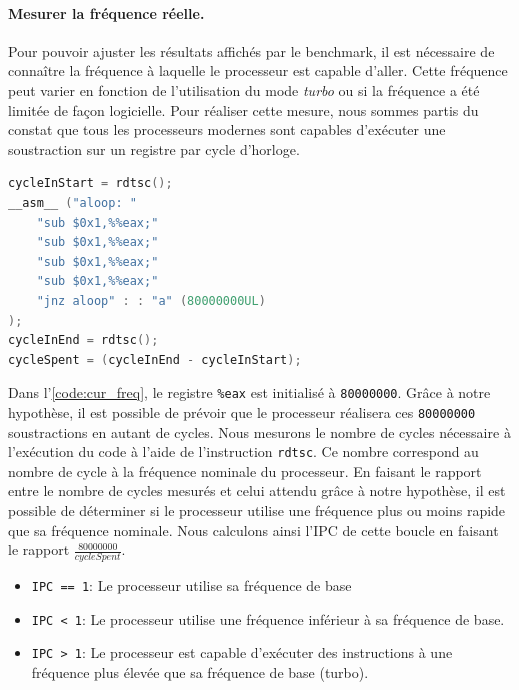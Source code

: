         \paragraph{Mesurer la fréquence réelle.} Pour pouvoir ajuster les résultats affichés par le benchmark, il est nécessaire de connaître la fréquence à laquelle le processeur est capable d'aller. Cette fréquence peut varier en fonction de l'utilisation du mode \textit{turbo} ou si la fréquence a été limitée de façon logicielle. Pour réaliser cette mesure, nous sommes partis du constat que tous les processeurs modernes sont capables d'exécuter une soustraction sur un registre par cycle d'horloge. 
        
         
\begin{minipage}{0.97\linewidth}         \begin{lstlisting}[label=code:cur_freq ,language=C, caption={Code utilisé pour mesurer la fréquence réelle du processeur.}]
cycleInStart = rdtsc();
__asm__ ("aloop: "
    "sub $0x1,%%eax;"
    "sub $0x1,%%eax;"
    "sub $0x1,%%eax;"
    "sub $0x1,%%eax;"
    "jnz aloop" : : "a" (80000000UL)
);
cycleInEnd = rdtsc();
cycleSpent = (cycleInEnd - cycleInStart);
\end{lstlisting} \end{minipage}  
        
        Dans l'\autoref{code:cur_freq}, le registre \verb|%eax| est initialisé à \verb|80000000|. Grâce à notre hypothèse, il est possible de prévoir que le processeur réalisera ces \verb|80000000| soustractions en autant de cycles. Nous mesurons le nombre de cycles nécessaire à l'exécution du code à l'aide de l'instruction \verb=rdtsc=. Ce nombre correspond au nombre de cycle à la fréquence nominale du processeur. En faisant le rapport entre le nombre de cycles mesurés et celui attendu grâce à notre hypothèse, il est possible de déterminer si le processeur utilise une fréquence plus ou moins rapide que sa fréquence nominale. Nous calculons ainsi l'IPC de cette boucle en faisant le rapport $\frac{80000000}{cycleSpent}$.
        \begin{itemize}
            \item \verb|IPC == 1|: Le processeur utilise sa fréquence de base
            \item \verb|IPC < 1|: Le processeur utilise une fréquence inférieur à sa fréquence de base.
            \item \verb|IPC > 1|: Le processeur est capable d'exécuter des instructions à une fréquence plus élevée que sa fréquence de base (turbo).
        \end{itemize}
    
